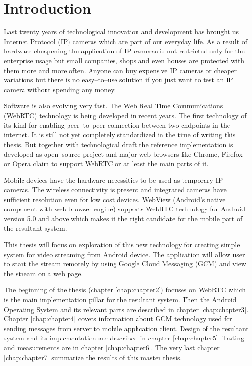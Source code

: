 \chapter{Introduction}
\label{chap:chapter1}
Last twenty years of technological innovation and development has brought us Internet Protocol (IP) cameras which are part of our everyday life. As a result of hardware cheapening the application of IP cameras is not restricted only for the enterprise usage but small companies, shops and even houses are protected with them more and more often. Anyone can buy expensive IP cameras or cheaper variations but there is no easy--to--use solution if you just want to test an IP camera without spending any money.

Software is also evolving very fast. The Web Real Time Communications (WebRTC) technology is being developed in recent years. The first technology of its kind for enabling peer--to--peer connection between two endpoints in the internet. It is still not yet completely standardized in the time of writing this thesis. But together with technological draft the reference implementation is developed as open--source project and major web browsers like Chrome, Firefox or Opera claim to support WebRTC or at least the main parts of it.

Mobile devices have the hardware necessities to be used as temporary IP cameras. The wireless connectivity is present and integrated cameras have sufficient resolution even for low cost devices. WebView (Android's native component with web browser engine) supports WebRTC technology for Android version 5.0 and above which makes it the right candidate for the mobile part of the resultant system.

This thesis will focus on exploration of this new technology for creating simple system for video streaming from Android device. The application will allow user to start the stream remotely by using Google Cloud Messaging (GCM) and view the stream on a web page. 

The beginning of the thesis (chapter \ref{chap:chapter2}) focuses on WebRTC which is the main implementation pillar for the resultant system. Then the Android Operating System and its relevant parts are described in chapter \ref{chap:chapter3}.
Chapter \ref{chap:chapter4} covers information about GCM technology used for sending messages from server to mobile application client.
Design of the resultant system and its implementation are described in chapter \ref{chap:chapter5}. Testing and measurements are in chapter \ref{chap:chapter6}.
The very last chapter \ref{chap:chapter7} summarize the results of this master thesis.
